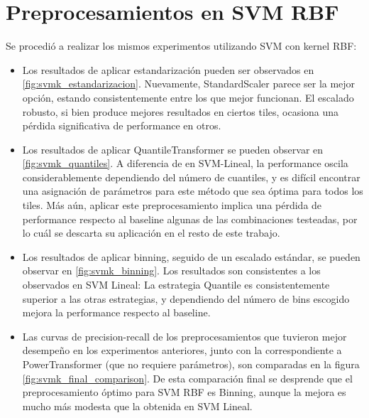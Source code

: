 


\section{Preprocesamientos en SVM RBF}

Se procedió a realizar los mismos experimentos utilizando SVM con kernel RBF:

\begin{itemize}
\item Los resultados de aplicar estandarización pueden ser observados en \ref{fig:svmk_estandarizacion}. Nuevamente, StandardScaler parece ser la mejor opción, estando consistentemente entre los que mejor funcionan. El escalado robusto, si bien produce mejores resultados en ciertos tiles, ocasiona una pérdida significativa de performance en otros.

\item Los resultados de aplicar QuantileTransformer se pueden observar en \ref{fig:svmk_quantiles}. A diferencia de en SVM-Lineal, la performance oscila considerablemente dependiendo del número de cuantiles, y es difícil encontrar una asignación de parámetros para este método que sea óptima para todos los tiles. Más aún, aplicar este preprocesamiento implica una pérdida de performance respecto al baseline algunas de las combinaciones testeadas, por lo cuál se descarta su aplicación en el resto de este trabajo.

\item Los resultados de aplicar binning, seguido de un escalado estándar, se pueden observar en \ref{fig:svmk_binning}. Los resultados son consistentes a los observados en SVM Lineal: La estrategia Quantile es consistentemente superior a las otras estrategias, y dependiendo del número de bins escogido mejora la performance respecto al baseline. 

\item Las curvas de precision-recall de los preprocesamientos que tuvieron mejor desempeño en los experimentos anteriores, junto con la correspondiente a PowerTransformer (que no requiere parámetros), son comparadas en la figura \ref{fig:svmk_final_comparison}. De esta comparación final se desprende que el preprocesamiento óptimo para SVM RBF es Binning, aunque la mejora es mucho más modesta que la obtenida en SVM Lineal.
\end{itemize}


